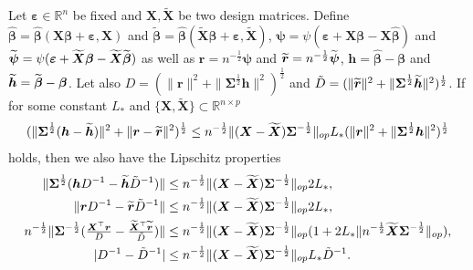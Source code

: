 \documentclass[11pt]{amsart}
\numberwithin{equation}{section}
\numberwithin{equation}{section}
\def\real{{\mathbb{R}}}
\def\R{{\real}}
\def\mathbold{\boldsymbol} %
\def\bh{\mathbold{h}}\def\hhat{\widehat{h}}\def\htil{\widetilde{h}}
\def\br{\mathbold{r}}\def\rhat{\widehat{r}}\def\rtil{\widetilde{r}}\def\rbar{{\overline r}}\def\brbar{{\overline \br}}
\def\bX{\mathbold{X}}\def\hbX{{\widehat{\bX}}}\def\tbX{{\widetilde{\bX}}}\def\bXbar{{\overline \bX}}
\def\bbeta{\mathbold{\beta}}\def\betahat{\widehat{\beta}}\def\hbeta{\widehat{\beta}}
\def\hbbeta{{{\widehat{\bbeta}}}}
\def\tbbeta{\widetilde{\bbeta}}
\def\ep{\varepsilon}\def\eps{\epsilon}\def\veps{\varepsilon}
\def\bep{ {\mathbold{\ep} }}
\def\bSigma{\mathbold{\Sigma}}\def\hbSigma{{\widehat{\bSigma}}}
\def\bpsi{\mathbold{\psi}}\def\psihat{\widehat{\psi}}\def\hpsi{\widehat{\psi}}
\begin{document}
\begin{lemma}
    \label{lemma:general-C}
    Let $\bep\in\R^n$ be fixed and $\bX,\tbX$ be two design matrices.
    Define $\hbbeta=\hbbeta(\bX\bbeta + \bep,\bX)$ and
    $\tbbeta = \hbbeta(\tbX\bbeta + \bep,\tbX)$,
    $\bpsi = \psi(\bep + \bX\bbeta - \bX\hbbeta)$
    and
    $\tbpsi = \psi(\bep + \tbX\bbeta - \tbX\tbbeta)$
    as well as
    $\br=n^{-\frac12}\bpsi$ and $\tbr=n^{-\frac12}\tbpsi$,
    $\bh=\hbbeta-\bbeta$ and $\tbh=\tbbeta-\bbeta$.
    Let also  $D=(\|\br\|^2 + \|\bSigma^{\frac12}\bh\|^2)^{\frac12}$
    and $\tilde D = (\|\tbr\|^2 + \|\bSigma^{\frac12}\tbh\|^2)^{\frac12}$.
    If for some constant $L_*$
    and $\{\bX,\tbX\}\subset \R^{n\times p}$
    \begin{equation}
    \label{eq:liscphitz-mu-h-r-general-C}
        (\|\bSigma^{\frac12}(\bh-\tbh)\|^2 + \|\br-\tbr\|^2 )^{\frac12}
        \le n^{-\frac12} \|(\bX-\tbX)\bSigma^{-\frac12}\|_{op} L_* (\|\br\|^2 + \|\bSigma^{\frac12}\bh\|^2)^{\frac12}
    \end{equation}
    holds, then we also have the Lipschitz properties
    \begin{align}
        \label{eq:lipschitz-bh-D-inverse}
        \|\bSigma^{\frac12}(\bh D^{-1} - \tbh \tilde D^{-1})\|   & \le
        n^{-\frac12}\|( \bX-\tbX)\bSigma^{-\frac12}\|_{op} 2 L_*,
        \\
        \|\br D^{-1} - \tbr \tilde D^{-1}\|   & \le
        n^{-\frac12}\|(\bX-\tbX)\bSigma^{-\frac12}\|_{op} 2 L_*,
        \label{eq:lipschitz-br-D-inverse}
        \\
        n^{-\frac12}\|\bSigma^{-\frac12}(\tfrac{\bX^\top \br}{D} -  \tfrac{\tbX{}^\top \tbr}{\tilde D} )\|   & \le
        n^{-\frac12}\|(\bX-\tbX)\bSigma^{-\frac12}\|_{op}(1 +  2 L_* \|n^{-\frac12}\tbX\bSigma^{-\frac12}\|_{op}),
        \label{eq:lipschitz-XT-br-D-inverse}
        \\
        |D^{-1} - \tilde D^{-1}|
        &
        \le n^{-\frac12}\|(\bX-\tbX)\bSigma^{-\frac12}\|_{op}
        L_* \tilde D^{-1}.
        \label{eq:lipschitz-D-inverse}
    \end{align}
\end{lemma}
\end{document}
